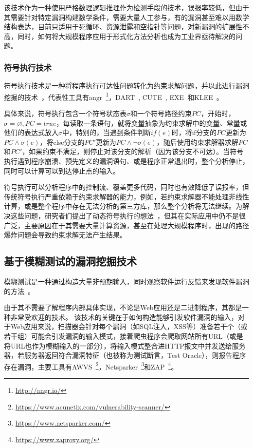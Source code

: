 该技术作为一种使用严格数理逻辑推理作为检测手段的技术，误报率较低，但由于其需要针对特定漏洞构建数学条件，需要大量人工参与，有的漏洞甚至难以用数学结构表达，目前只适用于死循环、资源泄露和空指针等问题，对新漏洞的扩展性不高，同时，如何将大规模程序应用于形式化方法分析也成为工业界亟待解决的问题。 

\subsubsection{符号执行技术}
符号执行技术是一种将程序执行可达性问题转化为约束求解问题，并以此进行漏洞挖掘的技术~\cite{sym:sum}，代表性工具有angr~\footnote{\url{http://angr.io/}}，DART~\cite{sym:dart}, CUTE~\cite{sym:cute}, EXE~\cite{sym:exe}和KLEE~\cite{sym:klee}。

具体来说，符号执行包含一个符号状态表$\sigma$和一个符号路径约束$PC$，开始时，$\sigma=\varnothing, PC=true$，每读取一条语句，就将变量抽象为约束求解中的变量、常量或他们的表达式放入$\sigma$中，特别的，当遇到条件判断$if(e)$时，将if分支的$PC$更新为$PC \wedge \sigma(e)$，将else分支的$PC'$更新为$PC\wedge \neg\sigma(e)$，随后使用约束求解器求解$PC$和$PC'$，如果约束不满足，则停止对该分支的解析（因为该分支不可达）。当符号执行遇到程序崩溃、预先定义的漏洞语句、或是程序正常退出时，整个分析停止，同时可以计算可以到达停止点的输入。

符号执行可以分析程序中的控制流、覆盖更多代码，同时也有效降低了误报率，但传统符号执行严重依赖于约束求解器的能力，例如，若约束求解器不能处理非线性计算，或是整个程序中存在无法分析的第三方库，那么整个分析将无法继续。为解决这些问题，研究者们提出了动态符号执行的想法~\cite{sym:dart,sym:cute,sym:exe,sym:klee}，但其在实际应用中仍不是很广泛，主要原因在于其需要大量计算资源，甚至在处理大规模程序时，出现的路径爆炸问题会导致约束求解无法产生结果。

\subsection{基于模糊测试的漏洞挖掘技术}
模糊测试是一种通过构造大量非预期输入，同时观察软件运行反馈来发现软件漏洞的方法~\cite{fuzzingstateofart}。

由于其不需要了解程序内部具体实现，不论是Web应用还是二进制程序，其都是一种非常受欢迎的技术。
该技术的关键在于如何构造能够引发软件漏洞的输入，对于Web应用来说，扫描器会针对每个漏洞（如SQL注入，XSS等）准备若干个（或若干组）可能会引发漏洞的输入模式，接着爬虫程序会爬取网站所有URL（或是将URL也作为模糊输入的一部分），将输入模式整合进HTTP报文中并发送给服务器，若服务器返回符合漏洞特征（也被称为测试断言，Test Oracle），则报告程序存在漏洞，主要工具有AWVS~\footnote{\url{https://www.acunetix.com/vulnerability-scanner/}}，Netsparker~\footnote{\url{https://www.netsparker.com/}}和ZAP~\footnote{\url{https://www.zaproxy.org/}}。

